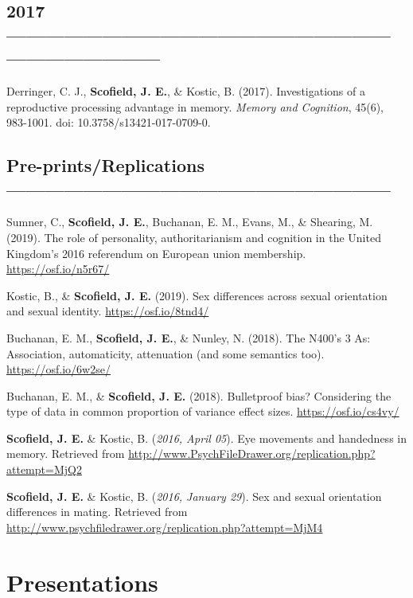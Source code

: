 \documentclass[11pt, a4paper]{awesome-cv}
\begin{document}
\hypertarget{section-3}{%
\subsection{2017 ------------------------------------------------------------------------------------}\label{section-3}}

Derringer, C. J., \textbf{Scofield, J. E.}, \& Kostic, B. (2017). Investigations of a reproductive processing advantage in memory. \emph{Memory and Cognition}, 45(6), 983-1001. doi: 10.3758/s13421-017-0709-0.

\hypertarget{pre-printsreplications}{%
\subsection{Pre-prints/Replications ------------------------------------------------------------}\label{pre-printsreplications}}

Sumner, C., \textbf{Scofield, J. E.}, Buchanan, E. M., Evans, M., \& Shearing, M. (2019). The role of personality, authoritarianism and cognition in the United Kingdom's 2016 referendum on European union membership. \url{https://osf.io/n5r67/}

Kostic, B., \& \textbf{Scofield, J. E.} (2019). Sex differences across sexual orientation and sexual identity. \url{https://osf.io/8tnd4/}

Buchanan, E. M., \textbf{Scofield, J. E.}, \& Nunley, N. (2018). The N400's 3 As: Association, automaticity, attenuation (and some semantics too). \url{https://osf.io/6w2se/}

Buchanan, E. M., \& \textbf{Scofield, J. E.} (2018). Bulletproof bias? Considering the type of data in common proportion of variance effect sizes. \url{https://osf.io/cs4vy/}

\textbf{Scofield, J. E.} \& Kostic, B. (\emph{2016, April 05}). Eye movements and handedness in memory. Retrieved from \url{http://www.PsychFileDrawer.org/replication.php?attempt=MjQ2}

\textbf{Scofield, J. E.} \& Kostic, B. (\emph{2016, January 29}). Sex and sexual orientation differences in mating.
Retrieved from \url{http://www.psychfiledrawer.org/replication.php?attempt=MjM4}

\hypertarget{presentations}{%
\section{Presentations}\label{presentations}}
\end{document}
